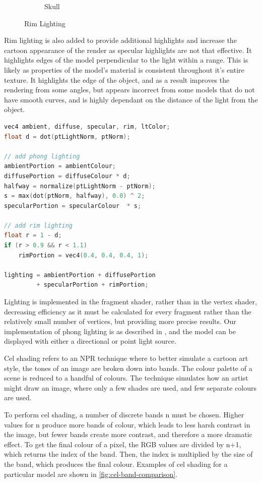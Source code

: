 \begin{figure}[h]
\begin{subfigure}[b]{0.31\textwidth}
    \caption{Skull}
    \label{fig:RimSkull}
    \end{subfigure}
    \caption{Rim Lighting}
    \label{fig:RimLighting}
\end{figure}

Rim lighting is also added to provide additional highlights and increase the cartoon appearance of the render as specular highlights are not that effective. It highlights edges of the model perpendicular to the light within a range. This is likely as properties of the model's material is consistent throughout it's entire texture. It highlights the edge of the object, and as a result improves the rendering from some angles, but appears incorrect from some models that do not have smooth curves, and is highly dependant on the distance of the light from the object. 

\newpage 
\begin{lstlisting}[language=C]
vec4 ambient, diffuse, specular, rim, ltColor;
float d = dot(ptLightNorm, ptNorm);

// add phong lighting
ambientPortion = ambientColour;
diffusePortion = diffuseColour * d;
halfway = normalize(ptLightNorm - ptNorm);
s = max(dot(ptNorm, halfway), 0.0) ^ 2;
specularPortion = specularColour  * s;

// add rim lighting
float r = 1 - d;
if (r > 0.9 && r < 1.1)
    rimPortion = vec4(0.4, 0.4, 0.4, 1);

lighting = ambientPortion + diffusePortion
         + specularPortion + rimPortion;
\end{lstlisting}

Lighting is implemented in the fragment shader, rather than in the vertex shader, decreasing efficiency as it must be calculated for every fragment rather than the relatively small number of vertices, but providing more precise results. Our implementation of phong lighting is as described in \cite{texbook}, and the model can be displayed with either a directional or point light source.

Cel shading refers to an NPR technique where to better simulate a cartoon art style, the tones of 
an image are broken down into bands. The colour palette of a scene is reduced to a handful of colours.
The technique simulates how an artist might draw an image, where only a few shades are used, and few
separate colours are used.

To perform cel shading, a number of discrete bands n must be chosen. Higher values for n produce more 
bands of colour, which leads to less harsh contrast in the image, but fewer bands create more contrast,
and therefore a more dramatic effect. To get the final colour of a pixel, the RGB values are divided by
n+1, which returns the index of the band. Then, the index is multiplied by the size of the band, which
produces the final colour. Examples of cel shading for a particular model are shown in 
\autoref{fig:cel-band-comparison}. 

